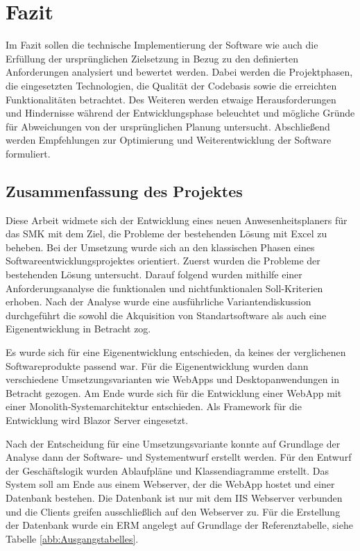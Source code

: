 \section{Fazit}
\label{sec:Fazit}
Im Fazit sollen die technische Implementierung der Software wie auch die Erfüllung der ursprünglichen Zielsetzung in Bezug zu den definierten Anforderungen analysiert und bewertet werden. Dabei werden die Projektphasen, die eingesetzten Technologien, die Qualität der Codebasis sowie die erreichten Funktionalitäten betrachtet. Des Weiteren werden etwaige Herausforderungen und Hindernisse während der Entwicklungsphase beleuchtet und mögliche Gründe für Abweichungen von der ursprünglichen Planung untersucht. Abschließend werden Empfehlungen zur Optimierung und Weiterentwicklung der Software formuliert.

\subsection{Zusammenfassung des Projektes}
\label{sec:Zusammenfassung}
Diese Arbeit widmete sich der Entwicklung eines neuen Anwesenheitsplaners für das SMK mit dem Ziel, die Probleme der bestehenden Lösung mit Excel zu beheben. Bei der Umsetzung wurde sich an den klassischen Phasen eines Softwareentwicklungsprojektes orientiert. Zuerst wurden die Probleme der bestehenden Lösung untersucht. Darauf folgend wurden mithilfe einer Anforderungsanalyse die funktionalen und nichtfunktionalen Soll-Kriterien erhoben. Nach der Analyse wurde eine ausführliche Variantendiskussion durchgeführt die sowohl die Akquisition von Standartsoftware als auch eine Eigenentwicklung in Betracht zog.

Es wurde sich für eine Eigenentwicklung entschieden, da keines der verglichenen Softwareprodukte passend war. Für die Eigenentwicklung wurden dann verschiedene Umsetzungsvarianten wie WebApps und Desktopanwendungen in Betracht gezogen. Am Ende wurde sich für die Entwicklung einer WebApp mit einer Monolith-Systemarchitektur entschieden. Als Framework für die Entwicklung wird Blazor Server eingesetzt.

Nach der Entscheidung für eine Umsetzungsvariante konnte auf Grundlage der Analyse dann der Software- und Systementwurf erstellt werden. Für den Entwurf der Geschäftslogik wurden Ablaufpläne und Klassendiagramme erstellt. Das System soll am Ende aus einem Webserver, der die WebApp hostet und einer Datenbank bestehen. Die Datenbank ist nur mit dem IIS Webserver verbunden und die Clients greifen ausschließlich auf den Webserver zu. Für die Erstellung der Datenbank wurde ein ERM angelegt auf Grundlage der Referenztabelle, siehe Tabelle \ref{abb:Ausgangstabelles}.

